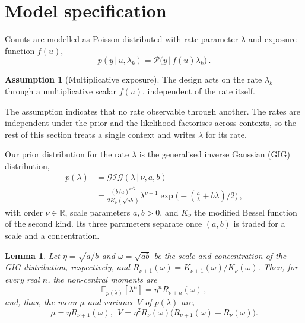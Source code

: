 \documentclass[twoside]{article}
\newcommand\given[1][]{\,#1\vert\,}
\providecommand{\Ex}[2]{\mathbb{E}_{#1}\!\left[#2\right]}
\providecommand{\Gig}{\mathcal{GIG}}  %
\theoremstyle{plain}
\newtheorem{lemma}{Lemma}
\theoremstyle{definition}
\newtheorem{assumption}{Assumption}
\theoremstyle{remark}
\begin{document}
\section{Model specification}
\label{sec:model}

Counts are modelled as Poisson distributed with rate parameter $\lambda$ and exposure function $f(u)$,
\begin{equation}
    p(y \given u, \lambda_k) = \mathcal{P}\big(y \given f(u) \lambda_k \big) \, .
    \label{eq:likelihood}
\end{equation}

\begin{assumption}[Multiplicative exposure]
    \label{as:exposure}
    The design acts on the rate $\lambda_k$ through a multiplicative scalar $f(u)$, independent of the rate itself.
\end{assumption}
The assumption indicates that no rate observable through another. The rates are independent under the prior and the likelihood factorises across contexts, so the rest of this section treats a single context and writes $\lambda$ for its rate.

Our prior distribution for the rate $\lambda$ is the generalised inverse Gaussian (GIG) distribution,
\begin{equation}
    \begin{split}
        p(\lambda) &= \Gig(\lambda \given \nu, a, b) \\
        &= \frac{(b/a)^{\nu/2}}{2 K_{\nu}(\sqrt{ab})} \lambda^{\nu - 1} \exp\big( -(\frac{a}{\lambda} + b \lambda)/2 \big) \,,
    \end{split}
    \label{eq:gig}
\end{equation}
%
with order $\nu \in \mathbb{R}$, scale parameters $a, b > 0$, and $K_{\nu}$ the modified Bessel function of the second kind.
Its three parameters separate once $(a, b)$ is traded for a scale and a concentration.

\begin{lemma}
    \label{lem:gig_moments}
    Let $\eta = \sqrt{a/b}$ and $\omega = \sqrt{ab}$ be the scale and concentration of the GIG distribution, respectively, and $R_{\nu+1}(\omega) = K_{\nu+1}(\omega) / K_{\nu}(\omega)$.
    Then, for every real $n$, the non-central moments are
    \begin{equation}
    		\Ex{p(\lambda)}{\lambda^{n}} = \eta^{n} R_{\nu+n}(\omega) \, ,
	\end{equation} 
	and, thus, the mean $\mu$ and variance $V$ of $p(\lambda)$ are, 
    \begin{equation}
        \mu \! = \! \eta R_{\nu+1}(\omega) , \ \ V \! = \! \eta^{2} R_{\nu} (\omega) \big( R_{\nu + 1}(\omega) \! - \! R_{\nu}(\omega) \big) .
        \label{eq:gig_moments}
    \end{equation}
\end{lemma}
\end{document}
